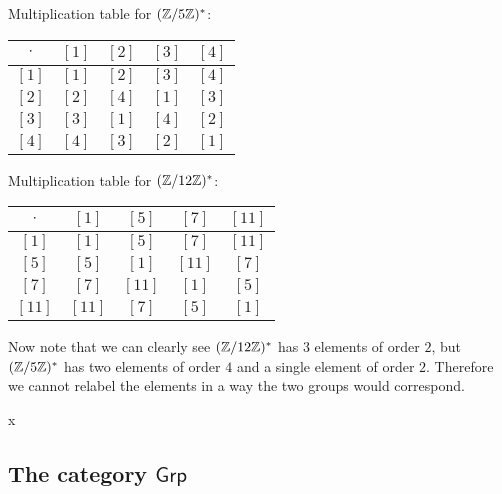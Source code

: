 \begin{solution}
	Multiplication table for $(\mathbb{Z}/5\mathbb{Z})^*$:
	
	\begin{center}
		\renewcommand{\arraystretch}{1.3}
		\begin{tabular}{c||c|c|c|c}
			$\cdot$ & $[1]$ & $[2]$ & $[3]$ & $[4]$ \\
			\hline\hline
			$[1]$ & $[1]$ & $[2]$ & $[3]$ & $[4]$ \\ 
			\hline
			$[2]$ & $[2]$ & $[4]$ & $[1]$ & $[3]$ \\ 
			\hline
			$[3]$ & $[3]$ & $[1]$ & $[4]$ & $[2]$ \\ 
			\hline
			$[4]$ & $[4]$ & $[3]$ & $[2]$ & $[1]$ \\ 
		\end{tabular}
	\end{center}

	Multiplication table for $(\mathbb{Z}/12\mathbb{Z})^*$:
	
	\begin{center}
		\renewcommand{\arraystretch}{1.3}
		\begin{tabular}{c||c|c|c|c}
			$\cdot$ & $[1]$ & $[5]$ & $[7]$ & $[11]$ \\
			\hline\hline
			$[1]$ & $[1]$ & $[5]$ & $[7]$ & $[11]$ \\ 
			\hline
			$[5]$ & $[5]$ & $[1]$ & $[11]$ & $[7]$ \\ 
			\hline
			$[7]$ & $[7]$ & $[11]$ & $[1]$ & $[5]$ \\ 
			\hline
			$[11]$ & $[11]$ & $[7]$ & $[5]$ & $[1]$ \\ 
		\end{tabular}
	\end{center}

	Now note that we can clearly see $(\mathbb{Z}/12\mathbb{Z})^*$ has $3$ elements of order $2$, but $(\mathbb{Z}/5\mathbb{Z})^*$ has two elements of order $4$ and a single element of order $2$. Therefore we cannot relabel the elements in a way the two groups would correspond.
\end{solution}

x\subsection{The category $\mathsf{Grp}$}

\begin{problem}
\end{problem}

